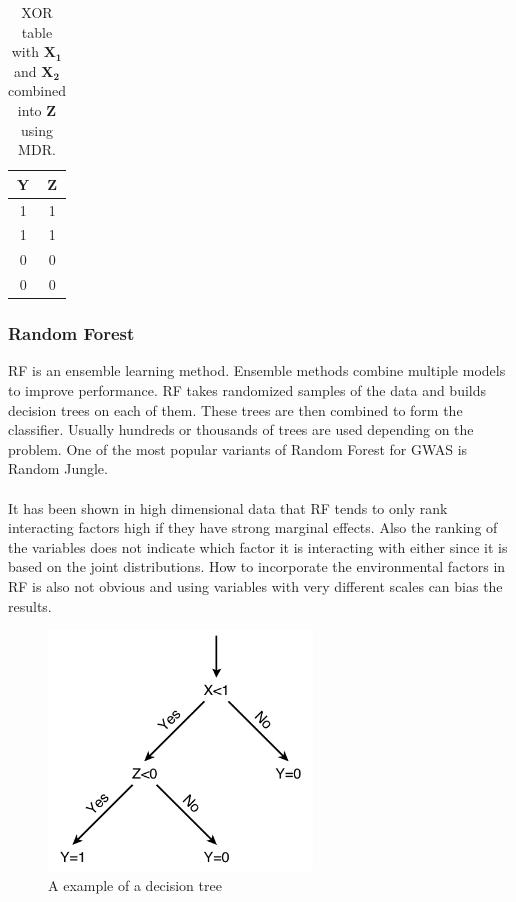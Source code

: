 \documentclass[10pt,a4paper]{report}
\begin{document}
\begin{table}[h]
\begin{tabular}{ | c | c | }
  \hline
  \textbf{Y} & \textbf{Z} \\
  \hline
  1 & 1 \\
  \hline
  1 & 1 \\
  \hline
  0 & 0 \\
  \hline
  0 & 0 \\
  \hline
\end{tabular}
\caption{XOR table with $\mathbf{X_1}$ and $\mathbf{X_2}$ combined into $\mathbf{Z}$ using MDR.}
\label{table:xor_mdr_table}
\end{table}

\subsubsection{Random Forest}
RF is an ensemble learning method\cite{random_forest}. Ensemble methods combine multiple models to improve performance. RF takes randomized samples of the data and builds decision trees on each of them. These trees are then combined to form the classifier. Usually hundreds or thousands of trees are used depending on the problem\cite{random_forest}. One of the most popular variants of Random Forest for GWAS is Random Jungle\cite{random_jungle}.\\
\\
It has been shown in high dimensional data that RF tends to only rank interacting factors high if they have strong marginal effects\cite{winham_rf_2012}. Also the ranking of the variables does not indicate which factor it is interacting with either since it is based on the joint distributions\cite{gene_enviroment_2013}. How to incorporate the environmental factors in RF is also not obvious and using variables with very different scales can bias the results\cite{gene_enviroment_2013}.

\begin{figure}[h]
    \centering
    \includegraphics[width=7cm]{Decision_Tree.png}
    \caption{A example of a decision tree}
    \label{fig:DecisionTree}
\end{figure}
\end{document}

